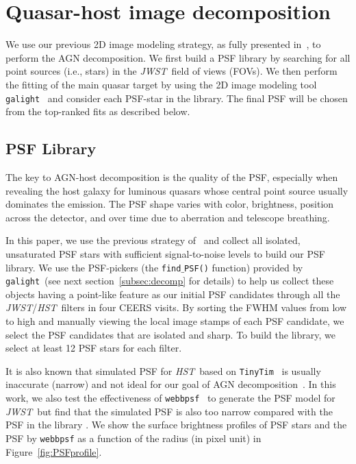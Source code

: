 \documentclass[twocolumn]{aastex631}
\newcommand{\galight}{\texttt{galight}}
\newcommand{\hst}{{\it HST}}
\newcommand{\jwst}{{\it JWST}}
\begin{document}
\section{Quasar-host image decomposition} \label{sec:decomp}
We use our previous 2D image modeling strategy, as fully presented in~\citet{Ding2020}, to perform the AGN decomposition. We first build a PSF library by searching for all point sources (i.e., stars) in the \jwst\ field of views (FOVs). We then perform the fitting of the main quasar target by using the 2D image modeling tool \galight~\citep{Ding2020, Ding2021a} and consider each PSF-star in the library. The final PSF will be chosen from the top-ranked fits as described below.

\subsection{PSF Library}\label{sec:psfLibrary}
The key to AGN-host decomposition is the quality of the PSF, especially when revealing the host galaxy for luminous quasars whose central point source usually dominates the emission. The PSF shape varies with color, brightness, position across the detector, and over time due to aberration and telescope breathing.

In this paper, we use the previous strategy of~\citet{Ding2022} and collect all isolated, unsaturated PSF stars with sufficient signal-to-noise levels to build our PSF library. We use the PSF-pickers (the \texttt{find$\_$PSF()} function) provided by \galight\ (see next section~\ref{subsec:decomp} for details) to help us collect these objects having a point-like feature as our initial PSF candidates through all the \jwst/\hst\ filters in four CEERS visits. By sorting the FWHM values from low to high and manually viewing the local image stamps of each PSF candidate, we select the PSF candidates that are isolated and sharp. To build the library, we select at least 12 PSF stars for each filter. 

It is also known that simulated PSF for \hst\ based on \texttt{TinyTim}~\citep{2011SPIE.8127E..0JK} is usually inaccurate (narrow) and not ideal for our goal of AGN decomposition~\citep[e.g.,][]{Mechtley2012}. In this work, we also test the effectiveness of \texttt{webbpsf}~\citep{2014SPIE.9143E..3XP} to generate the PSF model for \jwst\ but find that the simulated PSF is also too narrow compared with the PSF in the library \citep[see][for similar conclusions]{Ono2022}. We show the surface brightness profiles of PSF stars and the PSF by \texttt{webbpsf} as a function of the radius (in pixel unit) in Figure~\ref{fig:PSFprofile}. 
\end{document}
